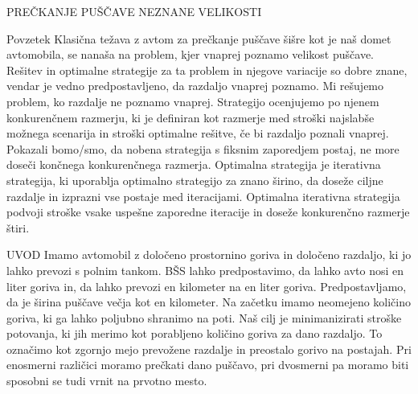 PREČKANJE PUŠČAVE NEZNANE VELIKOSTI

Povzetek
Klasična težava z avtom za prečkanje puščave šišre kot je naš domet avtomobila, se nanaša na problem, kjer vnaprej poznamo velikost puščave.
Rešitev in optimalne strategije za ta problem in njegove variacije so dobre znane, vendar je vedno predpostavljeno, da razdaljo vnaprej poznamo.
Mi rešujemo problem, ko razdalje ne poznamo vnaprej. Strategijo ocenjujemo po njenem konkurenčnem razmerju, ki je definiran kot razmerje med stroški najslabše možnega scenarija in stroški
optimalne rešitve, če bi razdaljo poznali vnaprej. Pokazali bomo/smo, da nobena strategija s fiksnim zaporedjem postaj, ne more doseči končnega konkurenčnega razmerja.
Optimalna strategija je iterativna strategija, ki uporablja optimalno strategijo za znano širino, da doseže ciljne razdalje in izprazni vse postaje med iteracijami.
Optimalna iterativna strategija podvoji stroške vsake uspešne zaporedne iteracije in doseže konkurenčno razmerje štiri.

UVOD
Imamo avtomobil z določeno prostornino goriva in določeno razdaljo, ki jo lahko prevozi s polnim tankom. BŠS lahko predpostavimo, da lahko avto nosi en liter goriva in, da 
lahko prevozi en kilometer na en liter goriva. Predpostavljamo, da je širina puščave večja kot en kilometer. Na začetku imamo neomejeno količino goriva, ki ga lahko poljubno shranimo
na poti. Naš cilj je minimanizirati stroške potovanja, ki jih merimo kot porabljeno količino goriva za dano razdaljo. To označimo kot zgornjo mejo prevožene razdalje in preostalo gorivo na postajah.
Pri enosmerni različici moramo prečkati dano puščavo, pri dvosmerni pa moramo biti sposobni se tudi vrnit na prvotno mesto.

